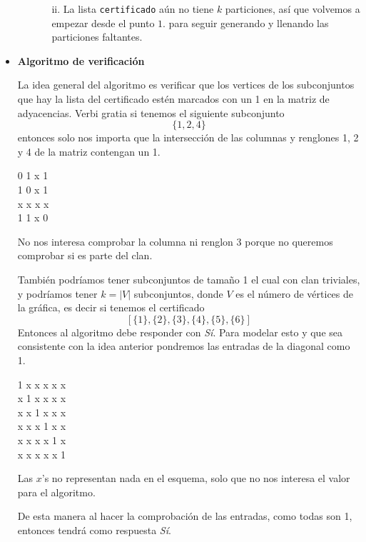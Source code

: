 \documentclass[12pt,letterpaper]{article}
\begin{document}
\begin{itemize}
\begin{itemize}
\begin{itemize}
            \item[ii.] La lista \texttt{certificado} aún no tiene $k$ 
            particiones, así que volvemos a empezar desde el punto $1.$
            para seguir generando y llenando las particiones faltantes. 
        \end{itemize}
    \end{itemize}    
    
    \item \textbf{Algoritmo de verificación}
    
    La idea general del algoritmo es verificar que los vertices de los subconjuntos que hay la lista del certificado estén marcados con un 1 en la matriz de adyacencias. Verbi gratia si tenemos el siguiente subconjunto $$\{1,2,4\}$$ entonces solo nos importa que la intersección de las columnas y renglones 1, 2 y 4 de la matriz contengan un 1.
    \begin{center}
    0 1 x 1\\
    1 0 x 1\\
    x x x x\\
    1 1 x 0\\
    \end{center}
    
    No nos interesa comprobar la columna ni renglon 3 porque no queremos comprobar si es parte del clan.
    
    También podríamos tener subconjuntos de tamaño 1 el cual con clan triviales, y podríamos tener $k = |V|$ subconjuntos, donde $V$ es el número de vértices de la gráfica, es decir si tenemos el certificado
    $$[\{1\},\{2\},\{3\},\{4\},\{5\},\{6\}]$$
    Entonces al algoritmo debe responder con \textit{Sí}.
    Para modelar esto y que sea consistente con la idea anterior pondremos las entradas de la diagonal como 1.
    \begin{center}
    1 x x x x x\\
    x 1 x x x x\\
    x x 1 x x x\\
    x x x 1 x x\\
    x x x x 1 x\\
    x x x x x 1\\
    \end{center}
    Las $x$'s no representan nada en el esquema, solo que no nos interesa el valor para el algoritmo.
    
    De esta manera al hacer la comprobación de las entradas, como todas son 1, entonces tendrá como respuesta \textit{Sí}.
    

\end{itemize}
\end{document}
